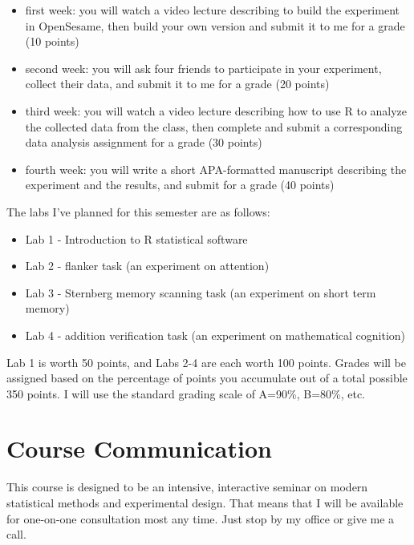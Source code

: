 \documentclass[10pt]{article}
\begin{document}
\begin{itemize}
\item first week: you will watch a video lecture describing to build the experiment in OpenSesame, then build your own version and submit it to me for a grade (10 points)
\item second week: you will ask four friends to participate in your experiment, collect their data, and submit it to me for a grade (20 points)
\item third week: you will watch a video lecture describing how to use R to analyze the collected data from the class, then complete and submit a corresponding data analysis assignment for a grade (30 points)
\item fourth week: you will write a short APA-formatted manuscript describing the experiment and the results, and submit for a grade (40 points)
\end{itemize}

The labs I've planned for this semester are as follows:

\begin{itemize}
\item Lab 1 - Introduction to R statistical software
\item Lab 2 - flanker task (an experiment on attention)
\item Lab 3 - Sternberg memory scanning task (an experiment on short term memory)
\item Lab 4 - addition verification task (an experiment on mathematical cognition)
\end{itemize}

Lab 1 is worth 50 points, and Labs 2-4 are each worth 100 points. Grades will be assigned based on the percentage of points you accumulate out of a total possible 350 points.  I will use the standard grading scale of A=90\%, B=80\%, etc.

\section*{Course Communication}
\label{sec:org6dee872}

This course is designed to be an intensive, interactive seminar on modern statistical methods and experimental design.  That means that I will be available for one-on-one consultation most any time.  Just stop by my office or give me a call.
\end{document}

